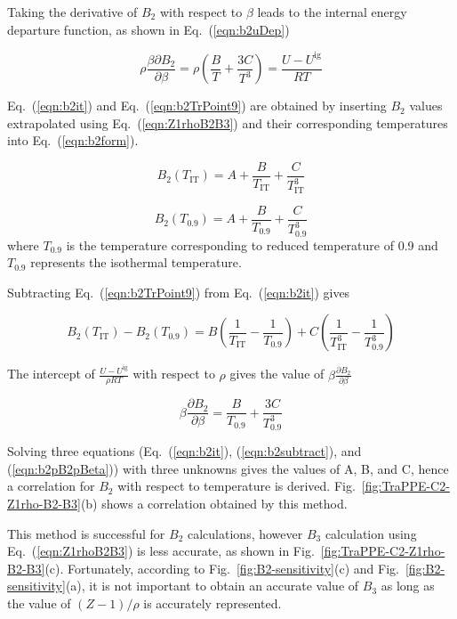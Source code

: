 \documentclass[5p,times]{elsarticle}
\begin{document}
Taking the derivative of $B_2$ with respect to $\beta$ leads to the internal energy departure function, as shown in  Eq.~(\ref{eqn:b2uDep})

\begin{equation}
\rho \frac{\beta \partial B_2}{\partial \beta}=\rho \left( \frac{B}{T}+\frac{3C}{T^3}\right)=\frac{U-U^{\mathrm{ig}}}{RT} \label{eqn:b2uDep}
\end{equation}

Eq.~(\ref{eqn:b2it}) and Eq.~(\ref{eqn:b2TrPoint9}) are obtained by inserting $B_2$ values extrapolated using Eq.~(\ref{eqn:Z1rhoB2B3}) and their corresponding temperatures into Eq.~(\ref{eqn:b2form}). 

\begin{equation}
B_2(T_{\mathrm{IT}})=A+\frac{B}{T_{\mathrm{IT}}}+\frac{C}{T_{\mathrm{IT}}^3} \label{eqn:b2it}
\end{equation}

\begin{equation}
B_2(T_{0.9})=A+\frac{B}{T_{0.9}}+\frac{C}{T_{0.9}^3} \label{eqn:b2TrPoint9}
\end{equation}
where $T_{0.9}$ is the temperature corresponding to reduced temperature of 0.9 and $T_{0.9}$ represents the isothermal temperature. 

Subtracting Eq.~(\ref{eqn:b2TrPoint9}) from Eq.~(\ref{eqn:b2it}) gives


\begin{equation}
B_2(T_{\mathrm{IT}})-B_2(T_{0.9})=B \left( \frac{1}{T_{\mathrm{IT}}}-\frac{1}{T_{0.9}} \right) +C \left( \frac{1}{T_{\mathrm{IT}}^3}-\frac{1}{T_{0.9}^3} \right) \label{eqn:b2subtract}
\end{equation}

The intercept of $\frac{U-U^{\mathrm{ig}}}{\rho RT}$ with respect to $\rho$ gives the value of $\beta \frac{\partial B_2}{\partial \beta}$

\begin{equation}
\beta \frac{\partial B_2}{\partial \beta}=\frac{B}{T_{0.9}}+\frac{3C}{T_{0.9}^3} \label{eqn:b2pB2pBeta}
\end{equation}

Solving three equations (Eq.~(\ref{eqn:b2it}), (\ref{eqn:b2subtract}), and (\ref{eqn:b2pB2pBeta})) with three unknowns gives the values of A, B, and C, hence a correlation for $B_2$ with respect to temperature is derived. Fig.~\ref{fig:TraPPE-C2-Z1rho-B2-B3}(b) shows a correlation obtained by this method. 

This method is successful for $B_2$ calculations, however $B_3$ calculation using Eq.~(\ref{eqn:Z1rhoB2B3}) is less accurate, as shown in Fig.~\ref{fig:TraPPE-C2-Z1rho-B2-B3}(c). Fortunately, according to Fig.~\ref{fig:B2-sensitivity}(c) and Fig.~\ref{fig:B2-sensitivity}(a), it is not important to obtain an accurate value of $B_3$ as long as the value of $(Z-1)/\rho$ is accurately represented.
\end{document}

